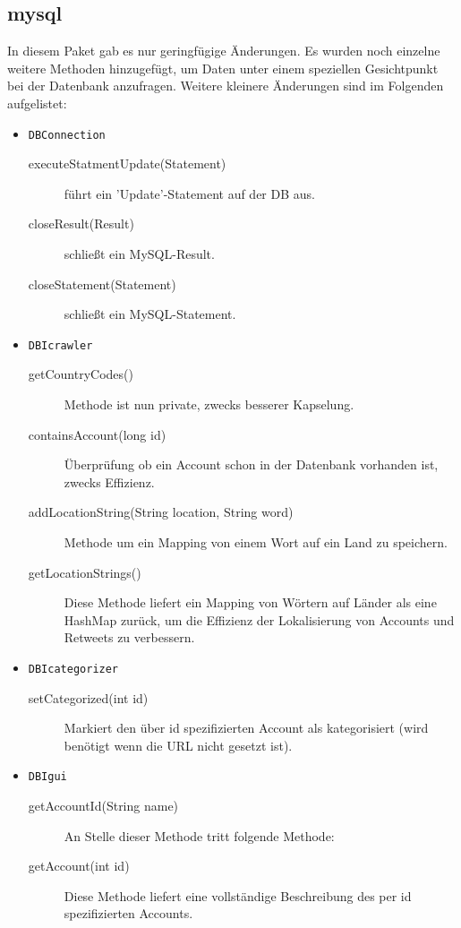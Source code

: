\subsection{mysql}
In diesem Paket gab es nur geringfügige Änderungen. Es wurden noch einzelne weitere Methoden hinzugefügt, um Daten unter einem speziellen Gesichtpunkt bei der Datenbank anzufragen. Weitere kleinere Änderungen sind im Folgenden aufgelistet:
\begin{itemize}
	\item \lstinline{DBConnection}
	\begin{description}
		\item[executeStatmentUpdate(Statement)] führt ein 'Update'-Statement auf der DB aus.
		\item[closeResult(Result)] schließt ein MySQL-Result.
		\item[closeStatement(Statement)] schließt ein MySQL-Statement.
	\end{description}
			\item \lstinline{DBIcrawler}
	\begin{description}
		\item[getCountryCodes()] Methode ist nun private, zwecks besserer Kapselung.
		\item[containsAccount(long id)] Überprüfung ob ein Account schon in der Datenbank vorhanden ist, zwecks Effizienz.	
		\item[addLocationString(String location, String word)] Methode um ein Mapping von einem Wort auf ein Land zu speichern.
		\item[getLocationStrings()] Diese Methode liefert ein Mapping von Wörtern auf Länder als eine HashMap zurück, um die Effizienz der Lokalisierung von Accounts und Retweets zu verbessern.
	\end{description}
		\item \lstinline{DBIcategorizer}
	\begin{description}
		\item[setCategorized(int id)] Markiert den über id spezifizierten Account als kategorisiert (wird benötigt wenn die URL nicht gesetzt ist).
	\end{description}
			\item \lstinline{DBIgui}
	\begin{description}
		\item[getAccountId(String name)] An Stelle dieser Methode tritt folgende Methode:
		\item[getAccount(int id)] Diese Methode liefert eine vollständige Beschreibung des per id spezifizierten Accounts.

\end{description}
\end{itemize}
